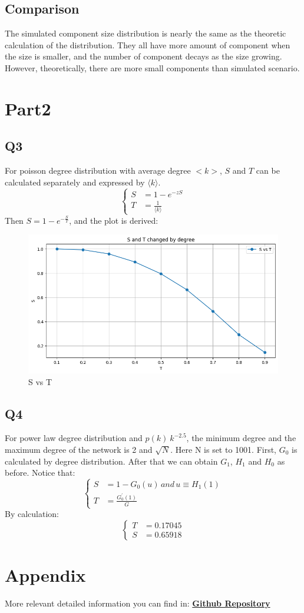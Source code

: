\documentclass{article}
\begin{document}
	\subsection*{Comparison}
	The simulated component size distribution is nearly the same as the theoretic calculation of the distribution. They all have more amount of component when the size is smaller, and the number of component decays as the size growing. However, theoretically, there are more small components than simulated scenario. 
	
	\section*{Part2}
	\subsection*{Q3}
	For poisson degree distribution with average degree $<k>$, $S$ and $T$ can be calculated separately and expressed by $\langle k \rangle$.
	\[
	\left\{
	\begin{aligned}
		S &= 1 - e^{-zS} \\
		T &= \frac{1}{\langle k \rangle}
	\end{aligned}
	\right.
	\]
	Then $S = 1 - e^{-\frac{S}{T}}$, and the plot is derived:
	\begin{figure}[H]
		\centering
		\includegraphics[scale=0.5]{P2Q3.png}
		\caption{S vs T}
	\end{figure}
	
	\subsection*{Q4}
	For power law degree distribution and $p(k) ~ k^{-2.5}$, the minimum degree and the maximum degree of the network is 2 and $\sqrt{N}$. Here N is set to 1001. First, $G_0$ is calculated by degree distribution. After that we can obtain $G_1$, $H_1$ and $H_0$ as before. Notice that:
	\[
	\left\{
	\begin{aligned}
		S &= 1- G_0(u) \, and \, u \equiv H_1(1) \\
		T &= \frac{G^{\prime}_0(1)}{G}
	\end{aligned}
	\right.
	\]
	By calculation:
	\[
	\left\{
	\begin{aligned}
		T &= 0.17045 \\
		S &= 0.65918
	\end{aligned}
	\right.
	\]
	
	\section*{Appendix}
	More relevant detailed information you can find in: 
	\href{https://github.com/DingYX0731/Selected-Topics-in-Frontiers-of-Statistics}{\textbf{Github Repository}}
	
	
\end{document}
